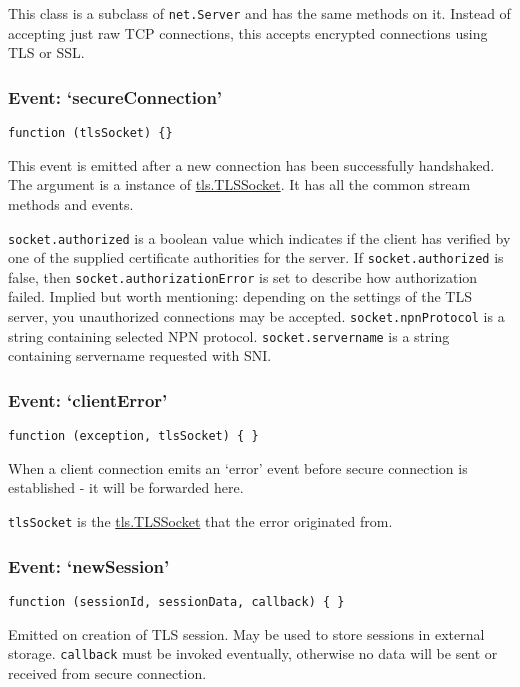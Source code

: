 This class is a subclass of \texttt{net.Server} and has the same methods
on it. Instead of accepting just raw TCP connections, this accepts
encrypted connections using TLS or SSL.

\subsubsection{Event: `secureConnection'}\label{event-secureconnection}

\texttt{function (tlsSocket) \{\}}

This event is emitted after a new connection has been successfully
handshaked. The argument is a instance of
\hyperref[tlsux5fclassux5ftlsux5ftlssocket]{tls.TLSSocket}. It has all
the common stream methods and events.

\texttt{socket.authorized} is a boolean value which indicates if the
client has verified by one of the supplied certificate authorities for
the server. If \texttt{socket.authorized} is false, then
\texttt{socket.authorizationError} is set to describe how authorization
failed. Implied but worth mentioning: depending on the settings of the
TLS server, you unauthorized connections may be accepted.
\texttt{socket.npnProtocol} is a string containing selected NPN
protocol. \texttt{socket.servername} is a string containing servername
requested with SNI.

\subsubsection{Event: `clientError'}\label{event-clienterror}

\texttt{function (exception, tlsSocket) \{ \}}

When a client connection emits an `error' event before secure connection
is established - it will be forwarded here.

\texttt{tlsSocket} is the
\hyperref[tlsux5fclassux5ftlsux5ftlssocket]{tls.TLSSocket} that the
error originated from.

\subsubsection{Event: `newSession'}\label{event-newsession}

\texttt{function (sessionId, sessionData, callback) \{ \}}

Emitted on creation of TLS session. May be used to store sessions in
external storage. \texttt{callback} must be invoked eventually,
otherwise no data will be sent or received from secure connection.

